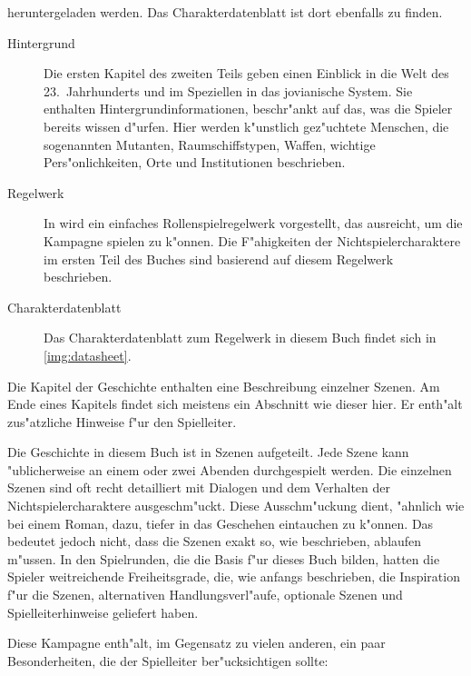 \begin{description}
        heruntergeladen werden. Das Charakterdatenblatt ist dort ebenfalls zu finden.
        \begin{description}
            \item [Hintergrund] Die ersten Kapitel des zweiten Teils  geben einen Einblick in die Welt des 
                23.~Jahrhunderts und im Speziellen in das jovianische System. Sie enthalten Hintergrundinformationen, beschr"ankt auf das, was die Spieler bereits wissen d"urfen. Hier werden k"unstlich gez"uchtete Menschen, die sogenannten Mutanten, Raumschiffstypen, Waffen, wichtige Pers"onlichkeiten, Orte und Institutionen beschrieben.
            \item [Regelwerk] In  wird ein einfaches Rollenspielregelwerk vorgestellt, das ausreicht, um die Kampagne 
                spielen zu k"onnen. Die F"ahigkeiten der Nichtspielercharaktere im ersten Teil des Buches sind basierend auf diesem Regelwerk beschrieben.
            \item [Charakterdatenblatt] Das Charakterdatenblatt zum Regelwerk in diesem Buch findet sich in \cref{img:datasheet}.
        \end{description}        
\end{description}


\begin{remarks}
    Die Kapitel der Geschichte enthalten eine Beschreibung einzelner Szenen. Am Ende eines Kapitels findet sich meistens ein Abschnitt wie dieser hier. Er enth"alt zus"atzliche Hinweise f"ur den Spielleiter.
\end{remarks}


Die Geschichte in diesem Buch ist in Szenen aufgeteilt. Jede Szene kann "ublicherweise an einem oder zwei Abenden durchgespielt werden. Die einzelnen Szenen sind oft recht detailliert mit Dialogen und dem Verhalten der Nichtspielercharaktere ausgeschm"uckt. Diese Ausschm"uckung dient, "ahnlich wie bei einem Roman, dazu, tiefer in das Geschehen eintauchen zu k"onnen. Das bedeutet jedoch nicht, dass die Szenen exakt so, wie beschrieben, ablaufen m"ussen. In den Spielrunden, die die Basis f"ur dieses Buch bilden, hatten die Spieler weitreichende Freiheitsgrade, die, wie anfangs beschrieben, die Inspiration f"ur die Szenen, alternativen Handlungsverl"aufe, optionale Szenen und Spielleiterhinweise geliefert haben.

Diese Kampagne enth"alt, im Gegensatz zu vielen anderen, ein paar Besonderheiten, die der Spielleiter ber"ucksichtigen sollte:

